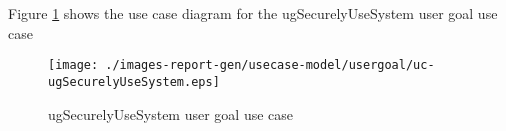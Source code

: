 Figure \ref{fig:lu.uni.lassy.excalibur.examples.icrash-RE-UCD-uc-ugSecurelyUseSystem}
shows the use case diagram for the ugSecurelyUseSystem user goal use case

\begin{figure}[htbp]
\begin{center}

\texttt{[image: ./images-report-gen/usecase-model/usergoal/uc-ugSecurelyUseSystem.eps]}
\end{center}
\caption[lu.uni.lassy.excalibur.examples.icrash Use Case Diagram: uc-ugSecurelyUseSystem]{ ugSecurelyUseSystem user goal use case}
\label{fig:lu.uni.lassy.excalibur.examples.icrash-RE-UCD-uc-ugSecurelyUseSystem}
\end{figure}
\vspace{0.5cm}
